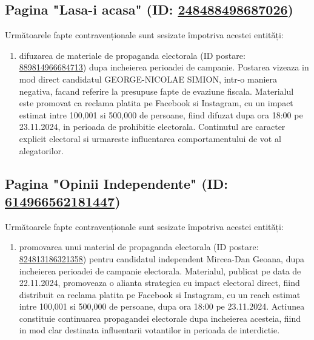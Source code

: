 \documentclass[a4paper,12pt]{article}
\begin{document}
\subsection{Pagina "Lasa-i acasa" (ID: \href{https://www.facebook.com/ads/library/?id=248488498687026}{248488498687026})}
Următoarele fapte contravenționale sunt sesizate împotriva acestei entități:

\begin{enumerate}[leftmargin=*, label=\arabic*.)]
    \item difuzarea de materiale de propaganda electorala (ID postare: \href{https://www.facebook.com/ads/library/?id=889814966684713}{889814966684713}) dupa incheierea perioadei de campanie. Postarea vizeaza in mod direct candidatul GEORGE-NICOLAE SIMION, intr-o maniera negativa, facand referire la presupuse fapte de evaziune fiscala. Materialul este promovat ca reclama platita pe Facebook si Instagram, cu un impact estimat intre 100,001 si 500,000 de persoane, fiind difuzat dupa ora 18:00 pe 23.11.2024, in perioada de prohibitie electorala. Continutul are caracter explicit electoral si urmareste influentarea comportamentului de vot al alegatorilor.
\end{enumerate}

\vspace{0.5cm}

\subsection{Pagina "Opinii Independente" (ID: \href{https://www.facebook.com/ads/library/?id=614966562181447}{614966562181447})}
Următoarele fapte contravenționale sunt sesizate împotriva acestei entități:

\begin{enumerate}[leftmargin=*, label=\arabic*.)]
    \item promovarea unui material de propaganda electorala (ID postare: \href{https://www.facebook.com/ads/library/?id=824813186321358}{824813186321358}) pentru candidatul independent Mircea-Dan Geoana, dupa incheierea perioadei de campanie electorala. Materialul, publicat pe data de 22.11.2024, promoveaza o alianta strategica cu impact electoral direct, fiind distribuit ca reclama platita pe Facebook si Instagram, cu un reach estimat intre 100,001 si 500,000 de persoane, dupa ora 18:00 pe 23.11.2024. Actiunea constituie continuarea propagandei electorale dupa incheierea acesteia, fiind in mod clar destinata influentarii votantilor in perioada de interdictie.
\end{enumerate}
\end{document}
